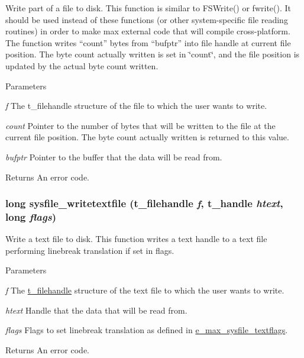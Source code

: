 Write part of a file to disk. This function is similar to FSWrite() or fwrite(). It should be used instead of these functions (or other system-\/specific file reading routines) in order to make max external code that will compile cross-\/platform. The function writes “count” bytes from “bufptr” into file handle at current file position. The byte count actually written is set in \char`\"{}count\char`\"{}, and the file position is updated by the actual byte count written.


\begin{DoxyParams}{Parameters}
\item[{\em f}]The t\_\-filehandle structure of the file to which the user wants to write. \item[{\em count}]Pointer to the number of bytes that will be written to the file at the current file position. The byte count actually written is returned to this value. \item[{\em bufptr}]Pointer to the buffer that the data will be read from. \end{DoxyParams}
\begin{DoxyReturn}{Returns}
An error code. 
\end{DoxyReturn}
\hypertarget{group__files_gae07b391866ede8506eb046cf0dd0f17c}{
\subsubsection[{sysfile\_\-writetextfile}]{\setlength{\rightskip}{0pt plus 5cm}long sysfile\_\-writetextfile ({\bf t\_\-filehandle} {\em f}, \/  {\bf t\_\-handle} {\em htext}, \/  long {\em flags})}}
\label{group__files_gae07b391866ede8506eb046cf0dd0f17c}


Write a text file to disk. This function writes a text handle to a text file performing linebreak translation if set in flags.


\begin{DoxyParams}{Parameters}
\item[{\em f}]The \hyperlink{group__files_gafcb776aa74d514754e83b30995b5a5d1}{t\_\-filehandle} structure of the text file to which the user wants to write. \item[{\em htext}]Handle that the data that will be read from. \item[{\em flags}]Flags to set linebreak translation as defined in \hyperlink{group__files_ga77d70855c1424d078789b0abe6bc94cd}{e\_\-max\_\-sysfile\_\-textflags}. \end{DoxyParams}
\begin{DoxyReturn}{Returns}
An error code. 
\end{DoxyReturn}
